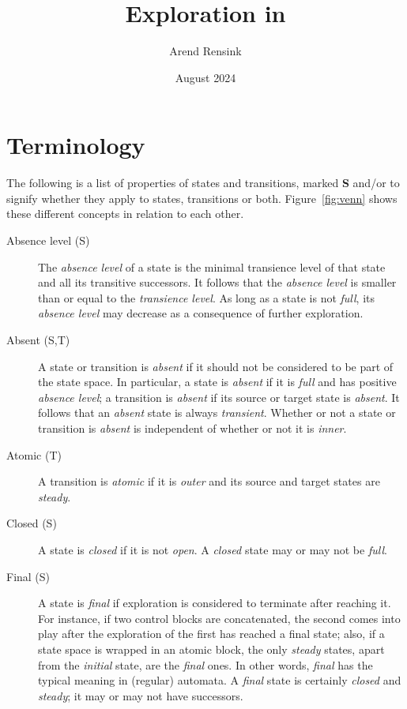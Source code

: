 \documentclass{article}
\begin{document}
\title{Exploration in \GROOVE}
\author{Arend Rensink}
\date{August 2024}
\maketitle

\section*{Terminology}

The following is a list of properties of states and transitions, marked \textbf{S} and/or  to signify whether they apply to states, transitions or both. Figure~\ref{fig:venn} shows these different concepts in relation to each other.

\begin{description}
\item[Absence level (S)] The \emph{absence level} of a state is the minimal transience level of that state and all its transitive successors. It follows that the \emph{absence level} is smaller than or equal to the \emph{transience level}. As long as a state is not \emph{full}, its \emph{absence level} may decrease as a consequence of further exploration.

\item[Absent (S,T)] A state or transition is \emph{absent} if it should not be considered to be part of the state space. In particular, a state is \emph{absent} if it is \emph{full} and has positive \emph{absence level}; a transition is \emph{absent} if its source or target state is \emph{absent}. It follows that an \emph{absent} state is always \emph{transient}. Whether or not a state or transition is \emph{absent} is independent of whether or not it is \emph{inner}.

\item[Atomic (T)] A transition is \emph{atomic} if it is \emph{outer} and its source and target states are \emph{steady}.

\item[Closed (S)] A state is \emph{closed} if it is not \emph{open}. A \emph{closed} state may or may not be \emph{full}.

\item[Final (S)] A state is \emph{final} if exploration is considered to terminate after reaching it. For instance, if two control blocks are concatenated, the second comes into play after the exploration of the first has reached a final state; also, if a state space is wrapped in an atomic block, the only \emph{steady} states, apart from the \emph{initial} state, are the \emph{final} ones. In other words, \emph{final} has the typical meaning in (regular) automata. A \emph{final} state is certainly \emph{closed} and \emph{steady}; it may or may not have successors.


\end{description}
\end{document}
